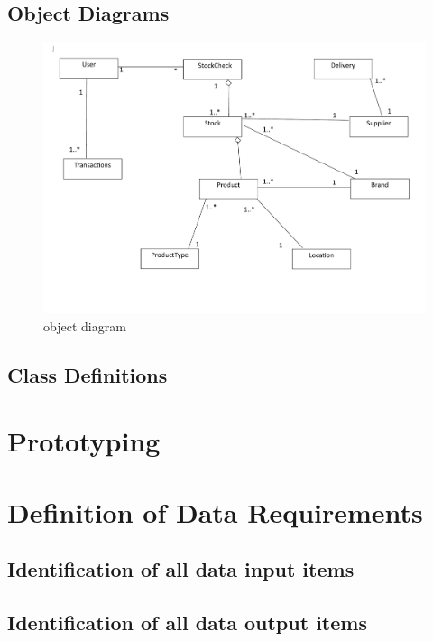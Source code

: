\subsection{Object Diagrams}

\begin{figure}[H]
    \includegraphics[width=\textwidth]{./Design/pdfimages/object_diagram.pdf}
    \caption{object diagram} \label{fig:object diagram}
\end{figure}

\subsection{Class Definitions}

\section{Prototyping}

\section{Definition of Data Requirements}

\subsection{Identification of all data input items}

\subsection{Identification of all data output items}

